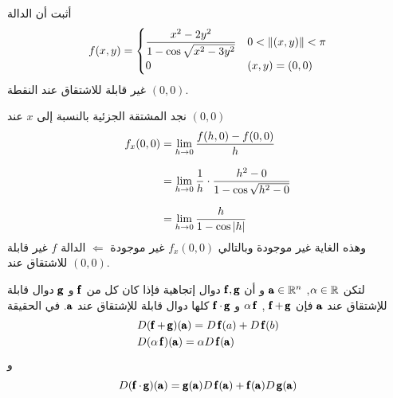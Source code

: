 \begin{example}
    أثبت أن الدالة 
    \[
    f(x,y)=\begin{cases}
        \dfrac{x^2-2y^2}{1-\cos{\sqrt{x^2-3y^2}}} & 0<\norm{(x,y)}<\pi\\
        0&(x,y)=(0,0)
    \end{cases}
    \]
    غير قابلة للاشتقاق عند النقطة $(0,0)$.
\end{example}
\begin{myproof}
    نجد المشتقة الجزئية بالنسبة إلى $x$ عند $(0,0)$
    \begin{align*}
    f_x(0,0)&=\lim\limits_{h\to0}\frac{f(h,0)-f(0,0)}{h}\\[7pt]
    &=\lim\limits_{h\to0}\frac{1}{h}\cdot\frac{h^2-0}{1-\cos{\sqrt{h^2-0}}}\\[7pt]
    &=\lim\limits_{h\to0}\frac{h}{1-\cos\abs{h}}
    \end{align*}
    وهذه الغاية غير موجودة وبالتالي $f_x(0,0)$ غير موجودة $\Leftarrow$ الدالة $f$ غير قابلة للاشتقاق عند $(0,0)$.
\end{myproof}
\begin{theorem}
    لتكن $\alpha\in\R$, $\A\in\R^n$ و أن $\f,\g$ دوال إتجاهية فإذا كان كل من $\f$ و $\g$ دوال قابلة للإشتقاق عند $\A$ فإن $\f+\g$ , $\alpha\f$ و $\f\cdot\g$ كلها دوال قابلة للإشتقاق عند $\A$. في الحقيقة
    \begin{align}
        &D(\f+\g)(\A)=D\f(a)+D\f(b)\\
        &D(\alpha\f)(\A)=\alpha D\f(\A)
    \end{align}
    و
\begin{equation}
    D(\f\cdot\g)(\A)=\g(\A)D\f(\A)+\f(\A)D\g(\A)
\end{equation}
\end{theorem}

